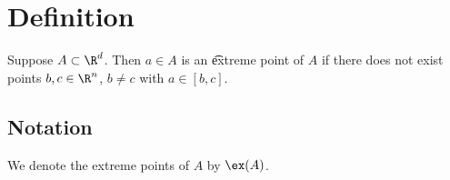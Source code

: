 

\section*{Definition}

Suppose $A \subset \R ^d$.
Then $a \in A$ is an \t{extreme point} of $A$ if there does not exist points $b, c \in \R ^n$, $b \neq c$ with $a \in [b, c]$.


\subsection*{Notation}

We denote the extreme points of $A$ by $\ex(A)$.

\blankpage
